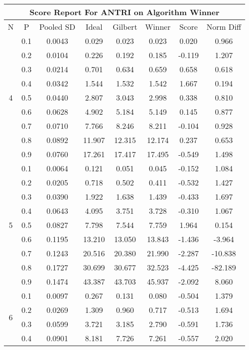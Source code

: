 \documentclass[11pt,a4paper]{report}
\begin{document}
\begin{longtable}{ | c | c || c | c | c | c | c | c | }
\hline
\multicolumn{8}{|c|}{ Score Report For ANTRI on Algorithm Winner} \\
\hline
N & P & Pooled SD &  Ideal &  Gilbert & Winner  & Score & Norm Diff \\
 \hline
 \hline
 \endhead
\multirow{9}{*}{4} & 0.1 & 0.0043 & 0.029 & 0.023 & 0.023 & 0.020 & 0.966 \\
 & 0.2 & 0.0104 & 0.226 & 0.192 & 0.185 & -0.119 & 1.207 \\
 & 0.3 & 0.0214 & 0.701 & 0.634 & 0.659 & 0.658 & 0.618 \\
 & 0.4 & 0.0342 & 1.544 & 1.532 & 1.542 & 1.667 & 0.194 \\
 & 0.5 & 0.0440 & 2.807 & 3.043 & 2.998 & 0.338 & 0.810 \\
 & 0.6 & 0.0628 & 4.902 & 5.184 & 5.149 & 0.145 & 0.877 \\
 & 0.7 & 0.0710 & 7.766 & 8.246 & 8.211 & -0.104 & 0.928 \\
 & 0.8 & 0.0892 & 11.907 & 12.315 & 12.174 & 0.237 & 0.653 \\
 & 0.9 & 0.0760 & 17.261 & 17.417 & 17.495 & -0.549 & 1.498 \\
 \hline
\multirow{9}{*}{5} & 0.1 & 0.0064 & 0.121 & 0.051 & 0.045 & -0.152 & 1.084 \\
 & 0.2 & 0.0205 & 0.718 & 0.502 & 0.411 & -0.532 & 1.427 \\
 & 0.3 & 0.0390 & 1.922 & 1.638 & 1.439 & -0.433 & 1.697 \\
 & 0.4 & 0.0643 & 4.095 & 3.751 & 3.728 & -0.310 & 1.067 \\
 & 0.5 & 0.0827 & 7.798 & 7.544 & 7.759 & 1.964 & 0.154 \\
 & 0.6 & 0.1195 & 13.210 & 13.050 & 13.843 & -1.436 & -3.964 \\
 & 0.7 & 0.1243 & 20.516 & 20.380 & 21.990 & -2.287 & -10.838 \\
 & 0.8 & 0.1727 & 30.699 & 30.677 & 32.523 & -4.425 & -82.189 \\
 & 0.9 & 0.1474 & 43.387 & 43.703 & 45.937 & -2.092 & 8.060 \\
 \hline
\multirow{9}{*}{6} & 0.1 & 0.0097 & 0.267 & 0.131 & 0.080 & -0.504 & 1.379 \\
 & 0.2 & 0.0269 & 1.309 & 0.960 & 0.717 & -0.513 & 1.694 \\
 & 0.3 & 0.0599 & 3.721 & 3.185 & 2.790 & -0.591 & 1.736 \\
 & 0.4 & 0.0901 & 8.181 & 7.726 & 7.261 & -0.557 & 2.020 \\

\end{longtable}
\end{document}

